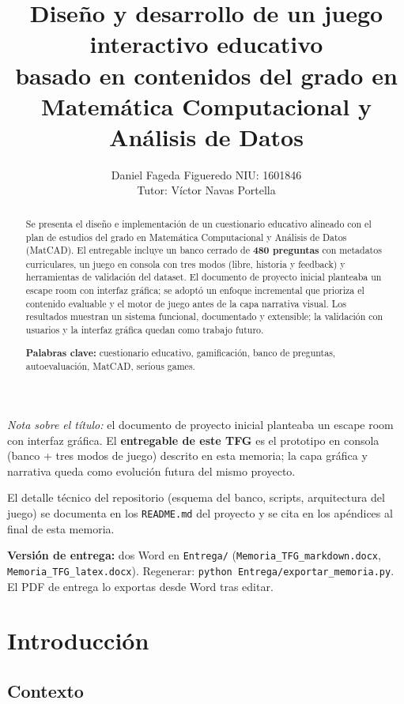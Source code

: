 \documentclass[11pt,a4paper]{article}
\title{Diseño y desarrollo de un juego interactivo educativo\\basado en contenidos del grado en Matemática Computacional y Análisis de Datos}
\author{%
  Daniel Fageda Figueredo \quad NIU: 1601846\\
  Tutor: Víctor Navas Portella
}
\date{}
\begin{document}
\maketitle

\noindent\textit{Nota sobre el título:} el documento de proyecto inicial planteaba un escape room con interfaz gráfica. El \textbf{entregable de este TFG} es el prototipo en consola (banco + tres modos de juego) descrito en esta memoria; la capa gráfica y narrativa queda como evolución futura del mismo proyecto.

\smallskip
\noindent El detalle técnico del repositorio (esquema del banco, scripts, arquitectura del juego) se documenta en los \texttt{README.md} del proyecto y se cita en los apéndices al final de esta memoria.

\smallskip
\noindent\textbf{Versión de entrega:} dos Word en \texttt{Entrega/} (\texttt{Memoria\_TFG\_markdown.docx}, \texttt{Memoria\_TFG\_latex.docx}). Regenerar: \texttt{python Entrega/exportar\_memoria.py}. El PDF de entrega lo exportas desde Word tras editar.

\begin{abstract}
\noindent Se presenta el diseño e implementación de un cuestionario educativo alineado con el plan de estudios del grado en Matemática Computacional y Análisis de Datos (MatCAD). El entregable incluye un banco cerrado de \textbf{480 preguntas} con metadatos curriculares, un juego en consola con tres modos (libre, historia y feedback) y herramientas de validación del dataset. El documento de proyecto inicial planteaba un escape room con interfaz gráfica; se adoptó un enfoque incremental que prioriza el contenido evaluable y el motor de juego antes de la capa narrativa visual. Los resultados muestran un sistema funcional, documentado y extensible; la validación con usuarios y la interfaz gráfica quedan como trabajo futuro.

\medskip
\noindent\textbf{Palabras clave:} cuestionario educativo, gamificación, banco de preguntas, autoevaluación, MatCAD, serious games.
\end{abstract}

\section{Introducción}

\subsection{Contexto}
\end{document}
